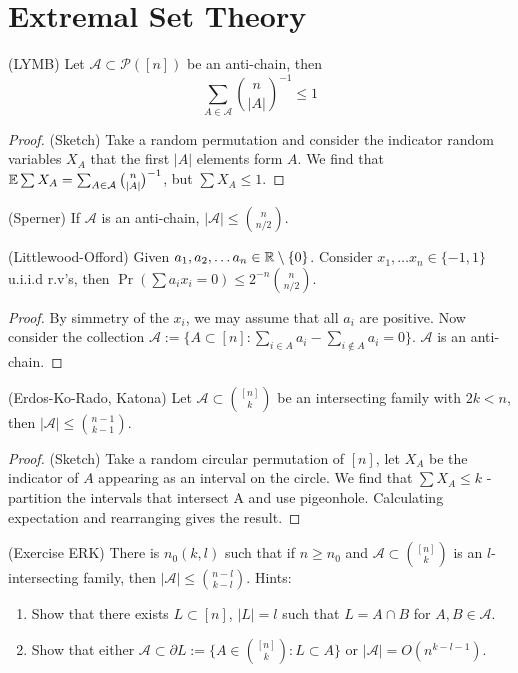 \section{Extremal Set Theory}
\label{section:extremal_set_theory}

\begin{lemma}
	(LYMB) Let $\mathcal{A} \subset \mathcal{P}([n])$ be an anti-chain, then
	\[
		\sum_{A \in \mathcal{A}} \binom{n}{|A|}^{-1} \leq 1
	\]
\end{lemma}

\begin{proof}
	(Sketch) Take a random permutation and consider the indicator
	random variables $X_A$ that the first $|A|$ elements form $A$.
	We find that $\mathbb{E} \sum X_A = \sum_{A \in \mathcal{A}}
	\binom{n}{|A|}^{-1}$, but $\sum X_A \leq 1$.
\end{proof}

\begin{corollary}
	(Sperner) If $\mathcal{A}$ is an anti-chain, $|\mathcal{A}| \leq
	\binom{n}{n/2}$.
\end{corollary}

\begin{corollary}
	(Littlewood-Offord) Given $a_1, a_2, \dots a_n \in \mathbb{R} \setminus
	\{0\}$. Consider $x_1, \dots x_n \in \{-1,1\}$ u.i.i.d r.v's,
	then $\Pr(\sum a_i x_i = 0) \leq 2^{-n}\binom{n}{n/2}$.
\end{corollary}
\begin{proof}
	By simmetry of the $x_i$, we may assume that all $a_i$ are
	positive. Now consider the collection
	$\mathcal{A} := \{A \subset [n] : \sum_{i \in A} a_i - \sum_{i \not
	\in A} a_i = 0\}$. $\mathcal{A}$ is an anti-chain.
\end{proof}

\begin{theorem} (Erdos-Ko-Rado, Katona)
	Let $\mathcal{A} \subset \binom{[n]}{k}$ be an intersecting family
	with $2k < n$, then $|\mathcal{A}| \leq \binom{n-1}{k-1}$.
\end{theorem}
\begin{proof}
	(Sketch) Take a random circular permutation of $[n]$, let $X_A$ be
	the indicator of $A$ appearing as an interval on the circle.
	We find that $\sum X_A \leq k$ - partition the intervals that
	intersect A and use pigeonhole. Calculating expectation and
	rearranging gives the result.
\end{proof}

\begin{theorem}
	(Exercise ERK) There is $n_0(k,l)$ such that if $n \geq n_0$ and
	$\mathcal{A} \subset \binom{[n]}{k}$ is an $l$-intersecting family,
	then $|\mathcal{A}| \leq \binom{n-l}{k-l}$. Hints:
	\begin{enumerate}
		\item Show that there exists $L \subset [n]$, $|L| = l$ such that
			$L = A \cap B$ for $A,B \in \mathcal{A}$.
		\item Show that either $\mathcal{A} \subset \partial L := \{A \in
			\binom{[n]}{k}: L \subset A\}$ or $|\mathcal{A}| = O(n^{k - l - 1})$.
	\end{enumerate}
\end{theorem}

